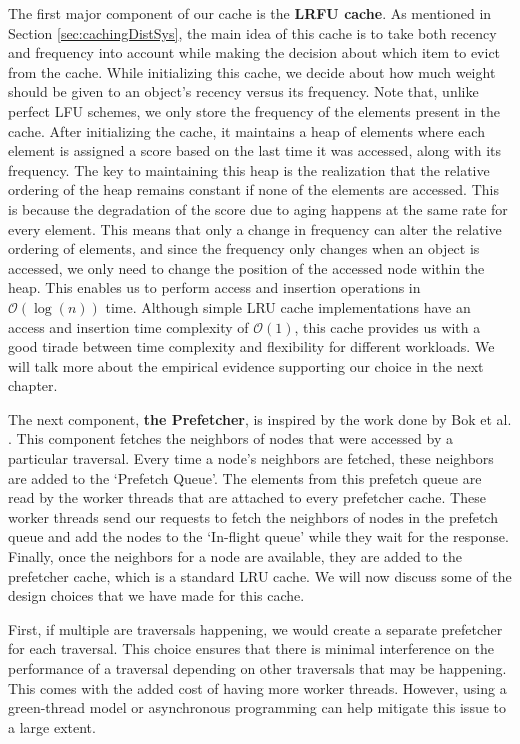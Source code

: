 \medskip
The first major component of our cache is the \textbf{LRFU
cache}\cite{lee2001lrfu}. As mentioned in Section \ref{sec:cachingDistSys}, the
main idea of this cache is to take both recency and frequency into account while
making the decision about which item to evict from the cache. While initializing
this cache, we decide about how much weight should be given to an
object's recency versus its frequency. Note that, unlike perfect LFU schemes, we
only store the frequency of the elements present in the cache. After
initializing the cache, it maintains a heap of elements where each element is
assigned a score based on the last time it was accessed, along with its
frequency. The key to maintaining this heap is the realization that the relative
ordering of the heap remains constant if none of the elements are accessed. This
is because the degradation of the score due to aging happens at the same
rate for every element. This means that only a change in frequency can alter
the relative ordering of elements, and since the frequency only changes when an
object is accessed, we only need to change the position of the accessed node
within the heap. This enables us to perform access and insertion operations in
$\mathcal{O}(\log(n))$ time. Although simple LRU cache implementations have an
access and insertion time complexity of $\mathcal{O}(1)$,  this cache provides 
us with a good tirade between time complexity and flexibility for 
different workloads. We will talk more about the empirical evidence supporting
our choice in the next chapter.

\medskip
The next component, \textbf{the Prefetcher}, is inspired by the work done
by Bok et al. \cite{bok2020memory}. This component fetches the neighbors of
nodes that were accessed by a particular traversal. Every time a node's
neighbors are fetched, these neighbors are added to the `Prefetch Queue'. The
elements from this prefetch queue are read by the worker threads that are
attached to every prefetcher cache. These worker threads send our requests to
fetch the neighbors of nodes in the prefetch queue and add the nodes to the
`In-flight queue' while they wait for the response. Finally, once the neighbors
for a node are available, they are added to the prefetcher cache, which is a
standard LRU cache. We will now discuss some of the design choices that we have
made for this cache.

\medskip
First, if multiple are traversals happening, we would create a separate
prefetcher for each traversal. This choice ensures that there is minimal
interference on the performance of a traversal depending on other traversals
that may be happening. This comes with the added cost of having more worker
threads. However, using a green-thread model or asynchronous programming can help
mitigate this issue to a large extent. 

